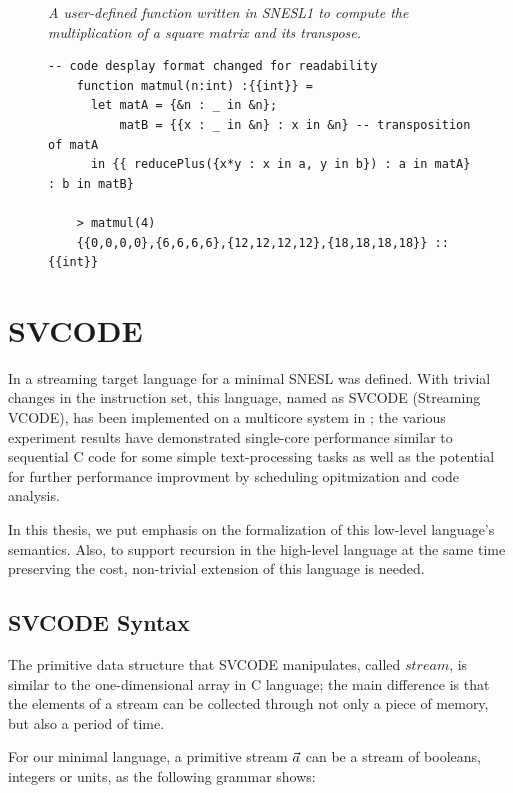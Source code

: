 \begin{figure}[H]\large
	\begin{example}\emph{A user-defined function  written in SNESL1 to compute the multiplication of a square matrix and its transpose.}
	\end{example}
	\begin{lstlisting}[style = snesl-style]
	-- code desplay format changed for readability
	function matmul(n:int) :{{int}} = 
  	  let matA = {&n : _ in &n};
	      matB = {{x : _ in &n} : x in &n} -- transposition of matA
	  in {{ reducePlus({x*y : x in a, y in b}) : a in matA} : b in matB}
	
	> matmul(4)
	{{0,0,0,0},{6,6,6,6},{12,12,12,12},{18,18,18,18}} :: {{int}}
	\end{lstlisting}
\end{figure}





\section{SVCODE}
In \cite{Fmaster} a streaming target language for a minimal SNESL was defined.
With trivial changes in the instruction set, this language, named as SVCODE (Streaming VCODE), has been implemented on a multicore system in \cite{Fphd}; the various experiment results
have demonstrated single-core performance similar to sequential C code for some simple 
text-processing tasks as well as the
potential for further performance improvment by scheduling opitmization and code analysis.

In this thesis, we put emphasis on the formalization of this low-level language's semantics.
Also, to support recursion in the high-level language at the same time preserving the cost, non-trivial extension of this language is needed. 

\subsection{SVCODE Syntax}
The primitive data structure that SVCODE manipulates, called $stream$, is similar to the one-dimensional array in C language; the main difference is that the elements of a stream can
be collected through not only a piece of memory, but also a period of time. 


For our minimal language, a primitive stream $\vec a$ can be a stream of booleans, integers or units, as the following grammar shows:

